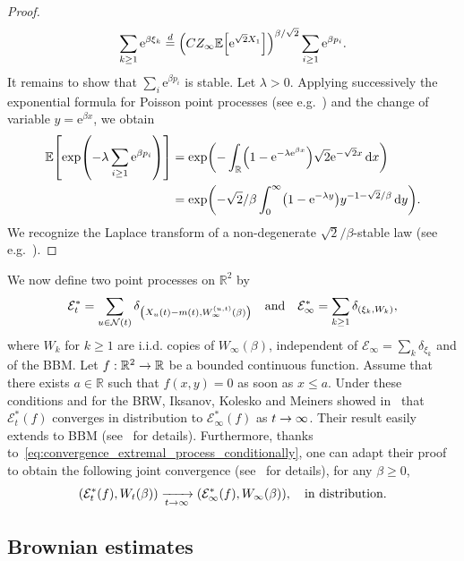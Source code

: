 \documentclass[AHL,Unicode,longabstracts,published]{cedram}
\newcommand{\e}{\mathrm{e}}
\renewcommand{\d}[1]{\mathop{}\!\mathrm{d}#1}
\newcommand{\R}{\mathbb{R}}
\newcommand\1{\mathds{1}}
\newcommand{\cE}{\mathcal{E}}
\newcommand{\cN}{\mathcal{N}}
\newcommand{\Expec}[1]{\mathbb{E}\left[#1\right]}
\let\originalleft\left
\let\originalright\right
\renewcommand{\left}{\mathopen{}\mathclose\bgroup\originalleft}
\renewcommand{\right}{\aftergroup\egroup\originalright}
\renewcommand*{\to}{\mathchoice{\longrightarrow}{\rightarrow}{\rightarrow}{\rightarrow}}
\begin{document}
\begin{proof}
\begin{equation*}
\sum_{k \geq 1} \e^{\beta \xi_k} \overset{d}{=} \left(C Z_\infty \Expec{\e^{\sqrt{2} X_1}}\right)^{\beta/\sqrt{2}} \sum_{i \geq 1} \e^{\beta p_i}.
\end{equation*}
It remains to show that $\sum_i \e^{\beta p_i}$ is stable. Let $\lambda > 0$. Applying successively the exponential formula for Poisson point processes (see e.g.~\cite[Section~0.5]{Bertoin1996}) and the change of variable $y = \e^{\beta x}$, we obtain
\begin{align*}
\Expec{\exp\left(-\lambda \sum_{i \geq 1} \e^{\beta p_i}\right)} &= \exp\left(-\int_\R \left(1 - \e^{-\lambda \e^{\beta x}}\right) \sqrt{2} \e^{-\sqrt{2} x} \d{x}\right) \\
&= \exp\left(-\sqrt{2}/\beta \int_0^\infty \left(1 - \e^{-\lambda y}\right) y^{-1-\sqrt{2}/\beta} \d{y}\right).
\end{align*}
We recognize the Laplace transform of a non-degenerate $\sqrt{2}/\beta$-stable law (see e.g.~\cite{Sato1999}).
\end{proof}

We now define two point processes on $\R^2$ by
\begin{equation}
\cE_t^* = \sum_{u \in \cN(t)} \delta_{\left(X_u(t) - m(t), W_\infty^{(u, t)}(\beta)\right)} \quad \text{and} \quad \cE_\infty^* = \sum_{k \geq 1} \delta_{\left(\xi_k, W_k\right)},
\end{equation}
where $W_k$ for $k \geq 1$ are i.i.d. copies of $W_\infty(\beta)$, independent of $\cE_\infty = \sum_{k} \delta_{\xi_k}$ and of the BBM. Let $f : \R^2 \to \R$ be a bounded continuous function. Assume that there exists $a \in \R$ such that $f(x, y) = 0$ as soon as $x \leq a$. Under these conditions and for the BRW, Iksanov, Kolesko and Meiners showed in~\cite[Lemma~5.2]{IksanovKoleskoMeiners2020} that $\cE_t^*(f)$ converges in distribution to $\cE_\infty^*(f)$ as $t \to \infty$. Their result easily extends to BBM (see~\cite[Lemma~5.9]{Chataignier2024} for details). Furthermore, thanks to~\eqref{eq:convergence_extremal_process_conditionally}, one can adapt their proof to obtain the following joint convergence (see~\cite[Remark~5.10]{Chataignier2024} for details), for any $\beta \geq 0$,
\begin{equation}\label{eq:joint_convergence}
(\cE_t^*(f), W_t(\beta)) \xrightarrow[t \to \infty]{} (\cE_\infty^*(f), W_\infty(\beta)), \quad \text{in distribution}.
\end{equation}

\subsection{Brownian estimates}
\end{document}
